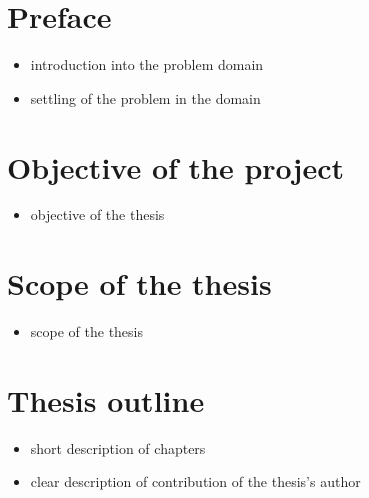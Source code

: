 \section{Preface}

\begin{itemize}
    \item introduction into the problem domain
    \item settling of the problem in the domain
\end{itemize}
    

\section{Objective of the project}

\begin{itemize}
    \item objective of the thesis 
\end{itemize}


\section{Scope of the thesis}

\begin{itemize}
    \item scope of the thesis
\end{itemize}


\section{Thesis outline}

\begin{itemize}
    \item short description of chapters
    \item clear description of contribution of the thesis's author
\end{itemize}
